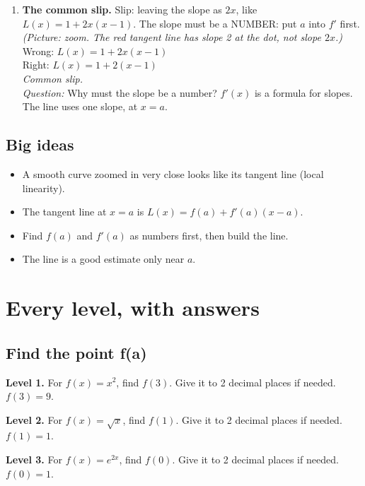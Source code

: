 \documentclass[11pt]{article}
\begin{document}
\begin{enumerate}
\item \textbf{The common slip.} Slip: leaving the slope as $2x$, like $L(x)=1+2x(x-1)$. The slope must be a NUMBER: put $a$ into $f'$ first. \textit{(Picture: zoom. The red tangent line has slope 2 at the dot, not slope $2x$.)}\\ Wrong: $L(x)=1+2x(x-1)$\\ Right: $L(x)=1+2(x-1)$\\ \textit{Common slip.}\\ \textit{Question:} Why must the slope be a number?  $f'(x)$ is a formula for slopes. The line uses one slope, at $x=a$.
\end{enumerate}
\subsection*{Big ideas}\begin{itemize}\item A smooth curve zoomed in very close looks like its tangent line (local linearity).
\item The tangent line at $x=a$ is $L(x)=f(a)+f'(a)(x-a)$.
\item Find $f(a)$ and $f'(a)$ as numbers first, then build the line.
\item The line is a good estimate only near $a$.\end{itemize}
\section*{Every level, with answers}
\subsection*{Find the point f(a)}
\noindent\textbf{Level 1.} For $f(x)=x^2$, find $f(3)$. Give it to 2 decimal places if needed.\\  \quad $f(3)=9$.\par\medskip
\noindent\textbf{Level 2.} For $f(x)=\sqrt{x}$, find $f(1)$. Give it to 2 decimal places if needed.\\  \quad $f(1)=1$.\par\medskip
\noindent\textbf{Level 3.} For $f(x)=e^{2x}$, find $f(0)$. Give it to 2 decimal places if needed.\\  \quad $f(0)=1$.\par\medskip
\end{document}
